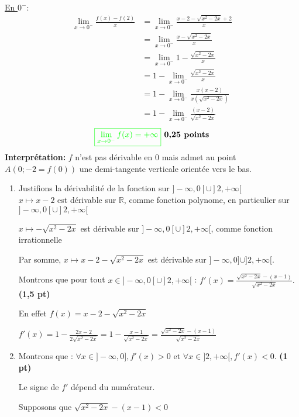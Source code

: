 \documentclass[12pt,a4paper]{article}
\begin{document}
\begin{enumerate}
\underline{En $0^{-}:$}
\begin{align*}
\lim_{x \to 0^{-}} \frac{f(x)-f(2)}{x} &= \lim_{x \to 0^{-}}\frac{x - 2 - \sqrt{x^2 - 2x}+2}{x}\\
												&= \lim_{x \to 0^{-}}\frac{x - \sqrt{x^2 - 2x}}{x}\\
												&=\lim_{x \to 0^{-}} 1-\frac{\sqrt{x^2 - 2x}}{x}\\
												&=1-\lim_{x \to 0^{-}}\frac{\sqrt{x^2 - 2x}}{x}\\
												&=1-\lim_{x \to 0^{-}}\frac{x(x - 2)}{ x(\sqrt{x^2 - 2x}) }\\
												&=1-\lim_{x \to 0^{-}}\frac{(x - 2)}{\sqrt{x^2 - 2x}}
\end{align*}
\[
\textcolor{green}{\boxed{ \lim_{x \to 0^{-}} f(x) =  +\infty }} \textbf{ 0,25 points}
\]
\textbf{Interprétation:} $f$ n'est pas dérivable en 0 mais admet au point $A(0;-2=f(0))$ une demi-tangente verticale orientée vers le bas.
\begin{enumerate}
    \item Justifions la dérivabilité de la fonction sur \( ]-\infty, 0[ \cup ]2, +\infty[ \)\\
    
$ x \mapsto x - 2 $ est dérivable sur $\mathbb{R}$, comme fonction polynome, en particulier sur \( ]-\infty, 0[ \cup ]2, +\infty[ \)

$ x \mapsto - \sqrt{x^2 - 2x}$ est dérivable sur \( ]-\infty, 0[ \cup ]2, +\infty[ \), comme fonction irrationnelle

Par somme, $ x \mapsto x - 2 - \sqrt{x^2 - 2x}$ est dérivable sur \( ]-\infty, 0] \cup ]2, +\infty[ \).

Montrons que pour tout \( x \in ]-\infty, 0[ \cup ]2, +\infty[ \) :
    \(
    f'(x) = \frac{\sqrt{x^2 - 2x} - (x - 1)}{\sqrt{x^2 - 2x}}.
    \)    \hspace{1cm} \textbf{(1,5 pt)}
    
En effet $f(x)=x - 2 - \sqrt{x^2 - 2x}$

$f'(x)=1 - \frac{2x-2}{2\sqrt{x^2 - 2x}}=1 - \frac{x-1}{\sqrt{x^2 - 2x}}=\frac{\sqrt{x^2 - 2x}-(x-1)}{\sqrt{x^2 - 2x}}$
\item Montrons que : \( \forall x \in ]-\infty, 0], f'(x) > 0 \) et \( \forall x \in ]2, +\infty[, f'(x) < 0 \). \hspace{1cm} \textbf{(1 pt)}

Le signe de $f'$ dépend du numérateur.

Supposons que $\sqrt{x^2 - 2x} - (x - 1) <0 $


\end{enumerate}
\end{enumerate}
\end{document}
